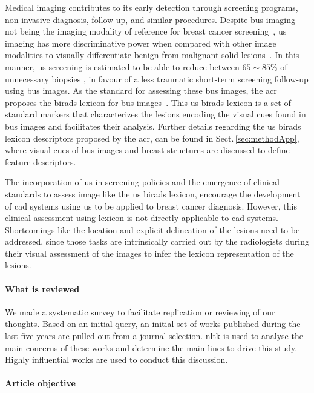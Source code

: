 Medical imaging contributes to its early detection through screening programs, non-invasive diagnosis, follow-up, and similar procedures.
Despite \ac{bus} imaging not being the imaging modality of reference for breast cancer screening~\cite{smith2003american}, \ac{us} imaging has more discriminative power when compared with other image modalities to visually differentiate benign from malignant solid lesions~\cite{Stavros:1995p12392}.
In this manner, \ac{us} screening is estimated to be able to reduce
between $65\sim85\%$ of unnecessary biopsies%
, in favour of a less traumatic short-term screening follow-up using \ac{bus} images.
As the standard for assessing these \ac{bus} images, the \ac{acr} proposes the \ac{birads} lexicon for \ac{bus} images~\cite{biradsus}.
This \ac{us} \ac{birads} lexicon is a set of standard markers that characterizes the lesions encoding the visual cues found in \ac{bus} images and facilitates their analysis.
Further details regarding the \ac{us} \ac{birads} lexicon descriptors proposed by the \ac{acr}, can be found in Sect.\,\ref{sec:methodApp}, where visual cues of \ac{bus} images and breast structures are discussed to define feature descriptors.

The incorporation of \ac{us} in screening policies and the emergence of clinical standards to assess image like the \ac{us} \ac{birads} lexicon, encourage the development of \ac{cad} systems using \ac{us} to be applied to breast cancer diagnosis.
However, this clinical assessment using lexicon is not directly applicable to \ac{cad} systems.
Shortcomings like the location and explicit delineation of the lesions need to be addressed, since those tasks are intrinsically carried out by the radiologists during their visual assessment of the images to infer the lexicon representation of the lesions.

\paragraph{What is reviewed}
\label{sec:intro:what_is_reviewed}
We made a systematic survey to facilitate replication or reviewing of our thoughts.
Based on an initial query, an initial set of works published during the last five years are pulled out from a journal selection.
\acf{nltk} is used to analyse the main concerns of these works and determine the main lines to drive this study.
Highly influential works are used to conduct this discussion.

\paragraph{Article objective}
\label{sec:intro:article_objective}

